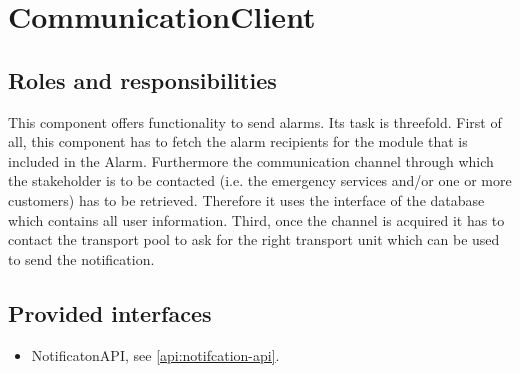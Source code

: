 \section{CommunicationClient}
\label{element:communication-client}

\subsection{Roles and responsibilities}

\npar This component offers functionality to send alarms. Its task is
threefold. First of all, this component has to fetch the alarm recipients for
the module that is included in the Alarm. Furthermore the communication channel
through which the stakeholder is to be contacted (i.e. the emergency services and/or one
or more customers) has to be retrieved. Therefore it uses the
 interface of the database which contains all user
information. Third, once the channel is acquired it has to contact the
transport pool to ask for the right transport unit which can be used to send the
notification.

\subsection{Provided interfaces}

\begin{itemize}
  \item NotificatonAPI, see \ref{api:notifcation-api}.
\end{itemize}